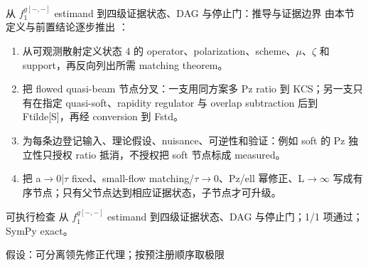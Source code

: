 \begin{frame}[t]{从 \ensuremath{f_1^{g[-,-]}} estimand 到四级证据状态、DAG 与停止门：推导与证据边界}
\footnotesize
{}\quad 由本节定义与前置结论逐步推出 ：
\begin{enumerate}
\item 从可观测散射定义状态 4 的 operator、polarization、scheme、\ensuremath{\mu}、\ensuremath{\zeta} 和 support，再反向列出所需 matching theorem。
\item 把 flowed quasi-beam 节点分叉：一支用同方案多 Pz ratio 到 KCS；另一支只有在指定 quasi-soft、rapidity regulator 与 overlap subtraction 后到 Ftilde[S]，再经 conversion 到 Fstd。
\item 为每条边登记输入、理论假设、nuisance、可逆性和验证：例如 soft 的 Pz 独立性只授权 ratio 抵消，不授权把 soft 节点标成 measured。
\item 把 a\ensuremath{\rightarrow}0|\ensuremath{\tau} fixed、small-flow matching/\allowbreak{}\ensuremath{\tau}\ensuremath{\rightarrow}0、Pz/\allowbreak{}ell 幂修正、L\ensuremath{\rightarrow}\ensuremath{\infty} 写成有序节点；只有父节点达到相应证据状态，子节点才可升级。
\end{enumerate}\begin{block}{可执行检查}
\quad 从 \ensuremath{f_1^{g[-,-]}} estimand 到四级证据状态、DAG 与停止门；1/1 项通过；SymPy exact。
\par\scriptsize 假设：可分离领先修正代理；按预注册顺序取极限
\end{block}
\end{frame}

